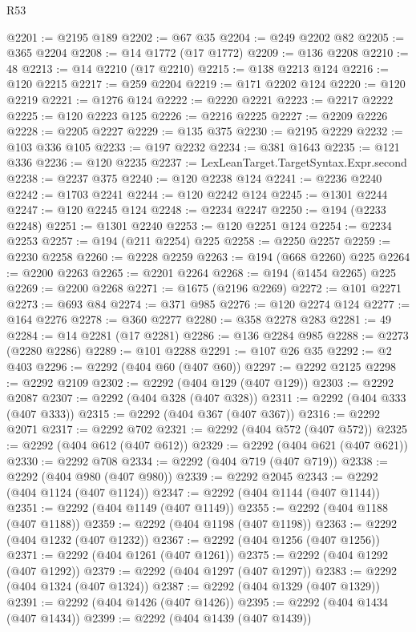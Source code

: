 \begin{lexlean}{R53}
\begin{coremodule}
@2201 := @2195 @189
@2202 := @67 @35
@2204 := @249 @2202 @82
@2205 := @365 @2204
@2208 := @14 @1772 (@17 @1772)
@2209 := @136 @2208
@2210 := 48
@2213 := @14 @2210 (@17 @2210)
@2215 := @138 @2213 @124
@2216 := @120 @2215
@2217 := @259 @2204
@2219 := @171 @2202 @124
@2220 := @120 @2219
@2221 := @1276 @124
@2222 := @2220 @2221
@2223 := @2217 @2222
@2225 := @120 @2223 @125
@2226 := @2216 @2225
@2227 := @2209 @2226
@2228 := @2205 @2227
@2229 := @135 @375
@2230 := @2195 @2229
@2232 := @103 @336 @105
@2233 := @197 @2232
@2234 := @381 @1643
@2235 := @121 @336
@2236 := @120 @2235
@2237 := LexLeanTarget.TargetSyntax.Expr.second
@2238 := @2237 @375
@2240 := @120 @2238 @124
@2241 := @2236 @2240
@2242 := @1703 @2241
@2244 := @120 @2242 @124
@2245 := @1301 @2244
@2247 := @120 @2245 @124
@2248 := @2234 @2247
@2250 := @194 (@2233 @2248)
@2251 := @1301 @2240
@2253 := @120 @2251 @124
@2254 := @2234 @2253
@2257 := @194 (@211 @2254) @225
@2258 := @2250 @2257
@2259 := @2230 @2258
@2260 := @2228 @2259
@2263 := @194 (@668 @2260) @225
@2264 := @2200 @2263
@2265 := @2201 @2264
@2268 := @194 (@1454 @2265) @225
@2269 := @2200 @2268
@2271 := @1675 (@2196 @2269)
@2272 := @101 @2271
@2273 := @693 @84
@2274 := @371 @985
@2276 := @120 @2274 @124
@2277 := @164 @2276
@2278 := @360 @2277
@2280 := @358 @2278 @283
@2281 := 49
@2284 := @14 @2281 (@17 @2281)
@2286 := @136 @2284 @985
@2288 := @2273 (@2280 @2286)
@2289 := @101 @2288
@2291 := @107 @26 @35
@2292 := @2 @403
@2296 := @2292 (@404 @60 (@407 @60))
@2297 := @2292 @2125
@2298 := @2292 @2109
@2302 := @2292 (@404 @129 (@407 @129))
@2303 := @2292 @2087
@2307 := @2292 (@404 @328 (@407 @328))
@2311 := @2292 (@404 @333 (@407 @333))
@2315 := @2292 (@404 @367 (@407 @367))
@2316 := @2292 @2071
@2317 := @2292 @702
@2321 := @2292 (@404 @572 (@407 @572))
@2325 := @2292 (@404 @612 (@407 @612))
@2329 := @2292 (@404 @621 (@407 @621))
@2330 := @2292 @708
@2334 := @2292 (@404 @719 (@407 @719))
@2338 := @2292 (@404 @980 (@407 @980))
@2339 := @2292 @2045
@2343 := @2292 (@404 @1124 (@407 @1124))
@2347 := @2292 (@404 @1144 (@407 @1144))
@2351 := @2292 (@404 @1149 (@407 @1149))
@2355 := @2292 (@404 @1188 (@407 @1188))
@2359 := @2292 (@404 @1198 (@407 @1198))
@2363 := @2292 (@404 @1232 (@407 @1232))
@2367 := @2292 (@404 @1256 (@407 @1256))
@2371 := @2292 (@404 @1261 (@407 @1261))
@2375 := @2292 (@404 @1292 (@407 @1292))
@2379 := @2292 (@404 @1297 (@407 @1297))
@2383 := @2292 (@404 @1324 (@407 @1324))
@2387 := @2292 (@404 @1329 (@407 @1329))
@2391 := @2292 (@404 @1426 (@407 @1426))
@2395 := @2292 (@404 @1434 (@407 @1434))
@2399 := @2292 (@404 @1439 (@407 @1439))

\end{coremodule}
\end{lexlean}
